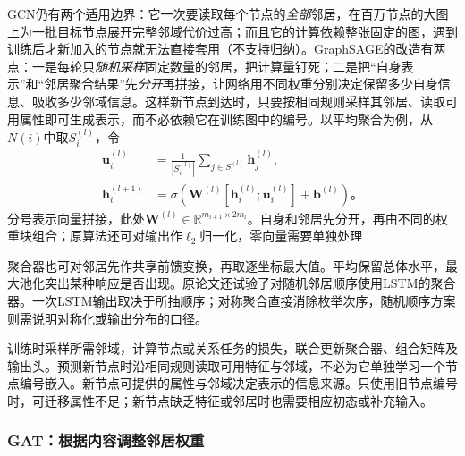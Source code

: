 GCN仍有两个适用边界：它一次要读取每个节点的\emph{全部}邻居，在百万节点的大图上为一批目标节点展开完整邻域代价过高；而且它的计算依赖整张固定的图，遇到训练后才新加入的节点就无法直接套用（不支持归纳）。GraphSAGE的改造有两点：一是每轮只\emph{随机采样}固定数量的邻居，把计算量钉死；二是把“自身表示”和“邻居聚合结果”先\emph{分开}再拼接，让网络用不同权重分别决定保留多少自身信息、吸收多少邻域信息。这样新节点到达时，只要按相同规则采样其邻居、读取可用属性即可生成表示，而不必依赖它在训练图中的编号。以平均聚合为例，从$N(i)$中取$S_i^{(l)}$，令
\begin{equation}
  \begin{aligned}
    \bm{u}_i^{(l)}&=\frac{1}{|S_i^{(l)}|}\sum_{j\in S_i^{(l)}}\bm{h}_j^{(l)},\\
    \bm{h}_i^{(l+1)}&=\sigma\!\left(
      \bm{W}^{(l)}[\bm{h}_i^{(l)};\bm{u}_i^{(l)}]+\bm{b}^{(l)}\right)\text{。}
  \end{aligned}
  \label{eq:gnn-graphsage}
\end{equation}
分号表示向量拼接，此处$\bm{W}^{(l)}\in\mathbb{R}^{m_{l+1}\times2m_l}$。自身和邻居先分开，再由不同的权重块组合；原算法还可对输出作$\ell_2$归一化，零向量需要单独处理

聚合器也可对邻居先作共享前馈变换，再取逐坐标最大值。平均保留总体水平，最大池化突出某种响应是否出现。原论文还试验了对随机邻居顺序使用LSTM的聚合器。一次LSTM输出取决于所抽顺序；对称聚合直接消除枚举次序，随机顺序方案则需说明对称化或输出分布的口径。

训练时采样所需邻域，计算节点或关系任务的损失，联合更新聚合器、组合矩阵及输出头。预测新节点时沿相同规则读取可用特征与邻域，不必为它单独学习一个节点编号嵌入。新节点可提供的属性与邻域决定表示的信息来源。只使用旧节点编号时，可迁移属性不足；新节点缺乏特征或邻居时也需要相应初态或补充输入。

\subsubsection{GAT：根据内容调整邻居权重}
\label{sec:gnn-gat}

